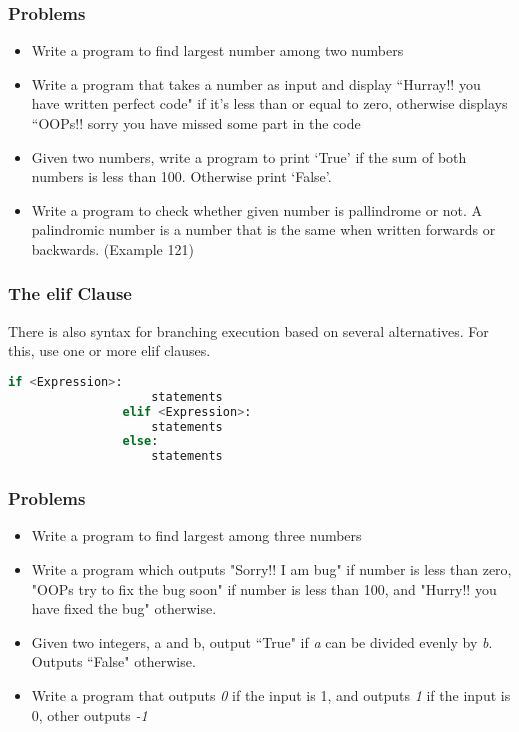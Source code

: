 \documentclass[14pt]{beamer}
\begin{document}
    \begin{frame}
        \frametitle{Problems}
        \begin{itemize}
            \item Write a program to find largest number among two numbers
            \item Write a program that takes a number as input and display ``Hurray!! you have written perfect code" if it's less than or equal to zero, otherwise displays ``OOPs!! sorry you have missed some part in the code
            \item Given two numbers, write a program to print `True' if the sum of both numbers is less than 100. Otherwise print `False'.
            \item Write a program to check whether given number is pallindrome or not. A palindromic number is a number that is the same when written forwards or backwards. (Example 121)
        \end{itemize}
    \end{frame}
    \begin{frame}
        \frametitle{The elif Clause}
        There is also syntax for branching execution based on several alternatives. For this, use one or more elif clauses.
        \begin{block}{}
            \begin{lstlisting}[language=Python]
                if <Expression>:
                    statements
                elif <Expression>:
                    statements
                else:
                    statements
            \end{lstlisting}
        \end{block}
    \end{frame}
    \begin{frame}
        \frametitle{Problems}
        \begin{itemize}
            \item Write a program to find largest among three numbers
            \item Write a program which outputs "Sorry!! I am bug" if number is less than zero, "OOPs try to fix the bug soon" if number is less than 100, and "Hurry!! you have fixed the bug" otherwise.
            \item Given two integers, a and b, output ``True" if \emph{a} can be divided evenly by \emph{b}. Outputs ``False" otherwise.
            \item Write a program that outputs \emph{0} if the input is 1, and outputs \emph{1} if the input is 0, other outputs \emph{-1}
        \end{itemize}
    \end{frame}
\end{document}
